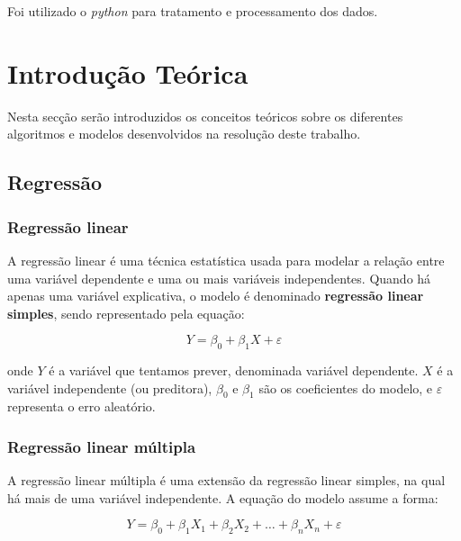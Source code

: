 \documentclass[conference]{IEEEtran}
\begin{document}
Foi utilizado o \textit{python} para tratamento e processamento dos dados.

\section{Introdução Teórica}

Nesta secção serão introduzidos os conceitos teóricos sobre os diferentes algoritmos e modelos desenvolvidos na resolução deste trabalho. 

\subsection{Regressão}

\subsubsection{Regressão linear}


A regressão linear é uma técnica estatística usada para modelar a relação entre uma variável dependente e uma ou mais variáveis independentes. Quando há apenas uma variável explicativa, o modelo é denominado \textbf{regressão linear simples}, sendo representado pela equação:

\begin{equation}
	Y = \beta_0 + \beta_1 X + \varepsilon
\end{equation}

onde \( Y \) é a variável que tentamos prever, denominada variável dependente. \( X \) é a variável independente (ou preditora), \( \beta_0 \) e \( \beta_1 \) são os coeficientes do modelo, e \( \varepsilon \) representa o erro aleatório. \cite{madureira2024aed}

\subsubsection{Regressão linear múltipla}
A regressão linear múltipla é uma extensão da regressão linear simples, na qual há mais de uma variável independente. A equação do modelo assume a forma:

\begin{equation}
	Y = \beta_0 + \beta_1 X_1 + \beta_2 X_2 + \dots + \beta_n X_n + \varepsilon
\end{equation}
\end{document}
